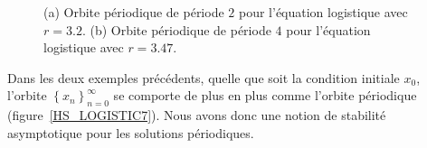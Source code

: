 {\begin{figure}
\centering
{}
\qquad
{}
\caption[Orbites périodiques de période $2$ et $4$ pour l'équation logistique]
{(a) Orbite périodique de période $2$ pour l'équation logistique avec
$r=3.2$.  (b) Orbite périodique de période $4$ pour l'équation
logistique avec $r=3.47$.}\label{HS_LOGISTIC56}
\end{figure}



Dans les deux exemples précédents, quelle que soit la condition
initiale $x_0$, l'orbite
$\displaystyle \left\{ x_n\right\}_{n=0}^\infty$ se comporte de plus
en plus comme l'orbite périodique (figure~\ref{HS_LOGISTIC7}).  Nous
avons donc une notion de stabilité asymptotique pour les solutions
périodiques.


}

